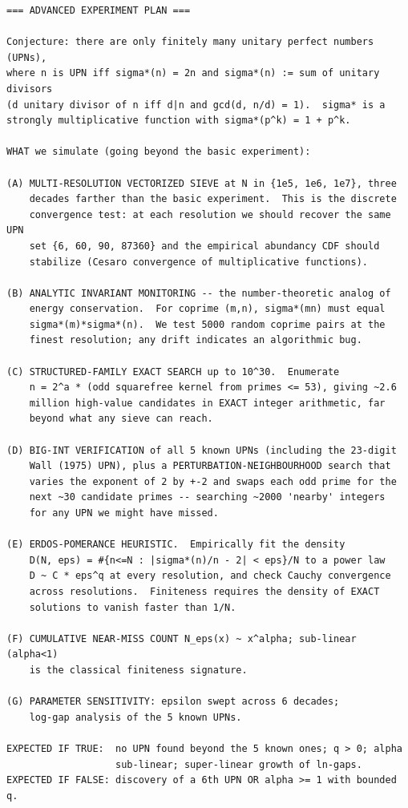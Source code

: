 \documentclass[11pt]{article}
\begin{document}
\begin{lstlisting}
=== ADVANCED EXPERIMENT PLAN ===

Conjecture: there are only finitely many unitary perfect numbers (UPNs),
where n is UPN iff sigma*(n) = 2n and sigma*(n) := sum of unitary divisors
(d unitary divisor of n iff d|n and gcd(d, n/d) = 1).  sigma* is a
strongly multiplicative function with sigma*(p^k) = 1 + p^k.

WHAT we simulate (going beyond the basic experiment):

(A) MULTI-RESOLUTION VECTORIZED SIEVE at N in {1e5, 1e6, 1e7}, three
    decades farther than the basic experiment.  This is the discrete
    convergence test: at each resolution we should recover the same UPN
    set {6, 60, 90, 87360} and the empirical abundancy CDF should
    stabilize (Cesaro convergence of multiplicative functions).

(B) ANALYTIC INVARIANT MONITORING -- the number-theoretic analog of
    energy conservation.  For coprime (m,n), sigma*(mn) must equal
    sigma*(m)*sigma*(n).  We test 5000 random coprime pairs at the
    finest resolution; any drift indicates an algorithmic bug.

(C) STRUCTURED-FAMILY EXACT SEARCH up to 10^30.  Enumerate
    n = 2^a * (odd squarefree kernel from primes <= 53), giving ~2.6
    million high-value candidates in EXACT integer arithmetic, far
    beyond what any sieve can reach.

(D) BIG-INT VERIFICATION of all 5 known UPNs (including the 23-digit
    Wall (1975) UPN), plus a PERTURBATION-NEIGHBOURHOOD search that
    varies the exponent of 2 by +-2 and swaps each odd prime for the
    next ~30 candidate primes -- searching ~2000 'nearby' integers
    for any UPN we might have missed.

(E) ERDOS-POMERANCE HEURISTIC.  Empirically fit the density
    D(N, eps) = #{n<=N : |sigma*(n)/n - 2| < eps}/N to a power law
    D ~ C * eps^q at every resolution, and check Cauchy convergence
    across resolutions.  Finiteness requires the density of EXACT
    solutions to vanish faster than 1/N.

(F) CUMULATIVE NEAR-MISS COUNT N_eps(x) ~ x^alpha; sub-linear (alpha<1)
    is the classical finiteness signature.

(G) PARAMETER SENSITIVITY: epsilon swept across 6 decades;
    log-gap analysis of the 5 known UPNs.

EXPECTED IF TRUE:  no UPN found beyond the 5 known ones; q > 0; alpha
                   sub-linear; super-linear growth of ln-gaps.
EXPECTED IF FALSE: discovery of a 6th UPN OR alpha >= 1 with bounded q.



\end{lstlisting}
\end{document}
